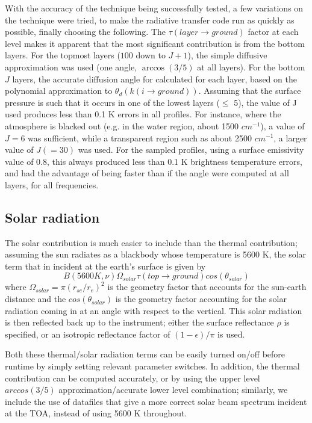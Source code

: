 \documentclass[11pt]{article}
\begin{document}
With the accuracy of the technique being successfully tested, a few 
variations on the technique were tried, to make the radiative transfer code 
run as quickly as possible, finally choosing the following. The 
$\tau(layer \rightarrow ground)$ factor at each level makes it apparent that 
the most significant contribution is from the bottom layers. For the topmost
layers ($100$ down to $J+1$), the simple diffusive approximation was
used (one angle, $\arccos(3/5)$ at all layers). For the bottom $J$
layers, the accurate diffusion angle for calculated for each layer,
based on the polynomial approximation to $\theta_{d}(k(i \rightarrow
ground))$. Assuming that the surface pressure is such that it occurs in one of
the lowest layers ($\leq$ 5), the value of J used produces less than 0.1 K 
errors in all profiles. For instance, where the atmosphere is blacked 
out (e.g. in the water region, about 1500 $cm^{-1}$), a value of $J=6$ was 
sufficient, while a transparent region such as about 2500 $cm^{-1}$, a larger 
value of $J(=30)$ was used. For the sampled profiles, using a surface 
emissivity value of 0.8, this always produced less than 0.1 K brightness 
temperature errors, and had the advantage of being faster than if the angle 
were computed at all layers, for all frequencies.

\subsection{Solar radiation}
The solar contribution is much easier to include than the thermal
contribution; assuming the sun radiates as a blackbody whose
temperature is 5600 K, the solar term that in incident at the earth's
surface is given by
\begin{equation}
 B(5600 K,\nu) \Omega_{solar} \tau(top \rightarrow ground) cos(\theta_{solar})
\end{equation}
where $\Omega_{solar} = \pi(r_{se}/r_{e})^{2}$ is the geometry factor
that accounts for the sun-earth distance and the $cos(\theta_{solar})$
is the geometry factor accounting for the solar radiation coming in at
an angle with respect to the vertical. This solar radiation is then
reflected back up to the instrument; either the surface reflectance $\rho$ is 
specified, or an isotropic reflectance factor of $(1-\epsilon)/\pi$ is used.

Both these thermal/solar radiation terms can be easily turned on/off
before runtime by simply setting relevant parameter switches. In
addition, the thermal contribution can be computed accurately, or by
using the upper level $arccos(3/5)$ approximation/accurate lower level
combination; similarly, we include the use of datafiles that give a more
correct solar beam spectrum incident at the TOA, instead of using 
5600 K throughout.
\end{document}
